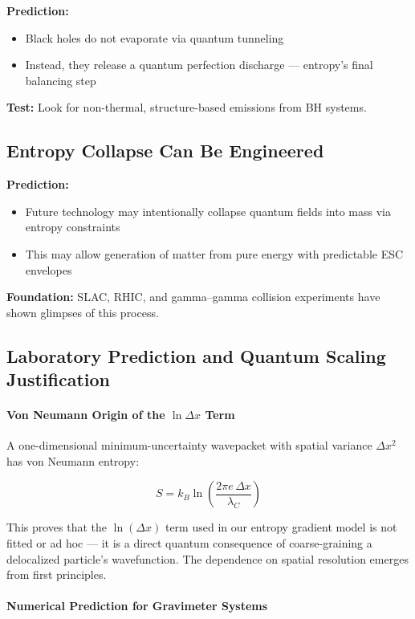 \documentclass[12pt]{article}
\begin{document}
\textbf{Prediction:}
\begin{itemize}
    \item Black holes do not evaporate via quantum tunneling
    \item Instead, they release a quantum perfection discharge — entropy’s final balancing step
\end{itemize}

\textbf{Test:} Look for non-thermal, structure-based emissions from BH systems.

\subsection{Entropy Collapse Can Be Engineered}

\textbf{Prediction:}
\begin{itemize}
    \item Future technology may intentionally collapse quantum fields into mass via entropy constraints
    \item This may allow generation of matter from pure energy with predictable ESC envelopes
\end{itemize}

\textbf{Foundation:} SLAC, RHIC, and gamma–gamma collision experiments have shown glimpses of this process.

\subsection{Laboratory Prediction and Quantum Scaling Justification}

\paragraph{Von Neumann Origin of the $\ln \Delta x$ Term}

A one-dimensional minimum-uncertainty wavepacket with spatial variance $\Delta x^2$ has von Neumann entropy:

\[
S = k_B \ln \left( \frac{2\pi e \, \Delta x}{\lambda_C} \right)
\]

This proves that the $\ln(\Delta x)$ term used in our entropy gradient model is not fitted or ad hoc — it is a direct quantum consequence of coarse-graining a delocalized particle’s wavefunction. The dependence on spatial resolution emerges from first principles.

\paragraph{Numerical Prediction for Gravimeter Systems}
\end{document}
